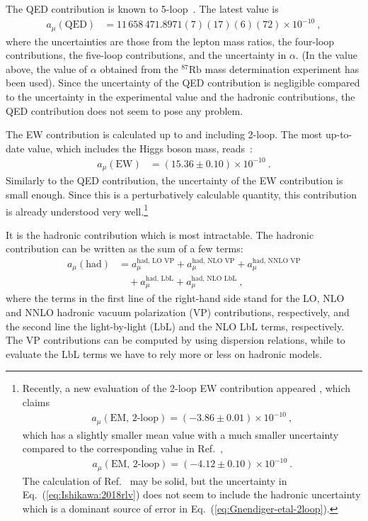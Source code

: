 The QED contribution is known to 5-loop~\cite{Aoyama-etal-2017}. 
The latest value is
%
\begin{align}
 a_\mu(\text{QED}) &=
  11 \, 658 \, 471.8971 (7)(17)(6)(72) \times 10^{-10} ~,
\label{eq:a_mu_QED}
\end{align}
%
where the uncertainties are those from the lepton mass ratios,
the four-loop contributions, the five-loop contributions,
and the uncertainty in $\alpha$.  (In the value above, the
value of $\alpha$ obtained from the ${}^{87}\text{Rb}$ mass
determination experiment has been used).  Since the uncertainty
of the QED contribution is negligible compared to the uncertainty 
in the experimental value and the hadronic contributions,
the QED contribution does not seem to pose any problem.


The EW contribution is calculated up to and including
2-loop.  The most up-to-date value, which includes 
the Higgs boson mass, reads~\cite{Gnendiger-etal}:
%
\begin{align}
 a_\mu(\text{EW}) &=  (15.36 \pm 0.10) \times 10^{-10} ~.
\label{eq:a_mu_EW}
\end{align}
%
Similarly to the QED contribution, the uncertainty of the EW
contribution is small enough.  Since this is a perturbatively
calculable quantity, this contribution is already understood
very well.\footnote{
Recently, a new evaluation of the 2-loop EW contribution
appeared \cite{Ishikawa:2018rlv}, which claims
%
\begin{align}
 a_\mu(\text{EM, 2-loop}) = (-3.86 \pm 0.01) \times 10^{-10}~,
\label{eq:Ishikawa:2018rlv}
\end{align}
%
which has a slightly smaller mean value with
a much smaller uncertainty compared to the corresponding value
in Ref.~\cite{Gnendiger-etal},
%
\begin{align}
 a_\mu(\text{EM, 2-loop}) = (-4.12 \pm 0.10) \times 10^{-10}~.
\label{eq:Gnendiger-etal-2loop}
\end{align}
%
The calculation of Ref.~\cite{eq:Ishikawa:2018rlv} may be solid,
but the uncertainty in Eq.~(\ref{eq:Ishikawa:2018rlv})
does not seem to include the hadronic uncertainty which is
a dominant source of error in Eq.~(\ref{eq:Gnendiger-etal-2loop}).}


It is the hadronic contribution which is most intractable.
The hadronic contribution can be written as the sum of a 
few terms:
%
\begin{align}
   a_\mu(\text{had})
&= a_\mu^{\text{had, LO VP}} +  a_\mu^{\text{had, NLO VP}}
+  a_\mu^{\text{had, NNLO VP}} \nonumber \\
%
&\quad + a_\mu^{\text{had, LbL}} +  a_\mu^{\text{had, NLO LbL}}~,
%
\end{align}
%
where the terms in the first line of the right-hand side stand
for the LO, NLO and NNLO hadronic vacuum polarization (VP)
contributions, respectively, and the second line
the light-by-light (LbL) and the NLO LbL terms, respectively.
The VP contributions can be computed by using dispersion 
relations, while to evaluate the LbL terms we have to 
rely more or less on hadronic models.

